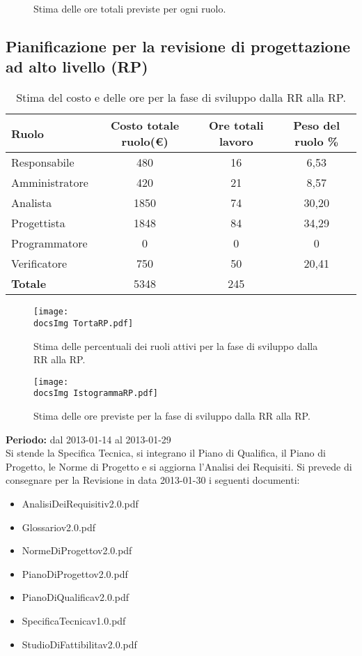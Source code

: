 {{\begin{figure}[h!]
	\caption{Stima delle ore totali previste per ogni ruolo.}
	
	\end{figure} 
	}
\newpage	
\subsection{Pianificazione per la revisione di progettazione ad alto livello (RP)}{
\begin{table}[h!]
		\begin{center}
			\begin{tabular}{l c c c}				
				\toprule
				Ruolo&	 Costo totale ruolo(\euro) 	&	Ore totali lavoro &	Peso del ruolo \% \\ 
				\midrule
				Responsabile&	480&		16&	6,53\\
				Amministratore&	420&		21&	8,57\\
				Analista&	1850&	74&	30,20\\
				Progettista&		1848	&	84&	34,29\\
				Programmatore&	0&	0&	0	\\
				Verificatore&	750&		50&	20,41\\ \hline
				\textbf{Totale}&		5348&	245	&\\
				\bottomrule
			\end{tabular}
		\end{center}	
		\caption{Stima del costo e delle ore per la fase di sviluppo dalla RR alla RP.}
	\end{table}
	\begin{figure}[h!]
	\centering
		\texttt{[image: \\docsImg TortaRP.pdf]}
		\caption{Stima delle percentuali dei ruoli attivi per la fase di sviluppo dalla RR alla RP.}  		
		\texttt{[image: \\docsImg IstogrammaRP.pdf]}

	\caption{Stima delle ore previste per la fase di sviluppo dalla RR alla RP.}
	
	\end{figure} 
	
		\textbf{Periodo:} dal 2013-01-14 al 2013-01-29\\
	Si stende la Specifica Tecnica, si integrano il Piano di Qualifica, il Piano di Progetto, le Norme di Progetto e si aggiorna l'Analisi dei Requisiti.
		 Si prevede di consegnare per la Revisione  in data 2013-01-30 i seguenti documenti:
		 \begin{itemize}
		 	\item AnalisiDeiRequisiti\textunderscore v2.0.pdf
		 	\item Glossario\textunderscore v2.0.pdf
		 	\item NormeDiProgetto\textunderscore v2.0.pdf
		 	\item PianoDiProgetto\textunderscore v2.0.pdf
		 	\item PianoDiQualifica\textunderscore v2.0.pdf
		 	\item SpecificaTecnica\textunderscore v1.0.pdf
		 	\item StudioDiFattibilita\textunderscore v2.0.pdf
		 \end{itemize}
		
}}
